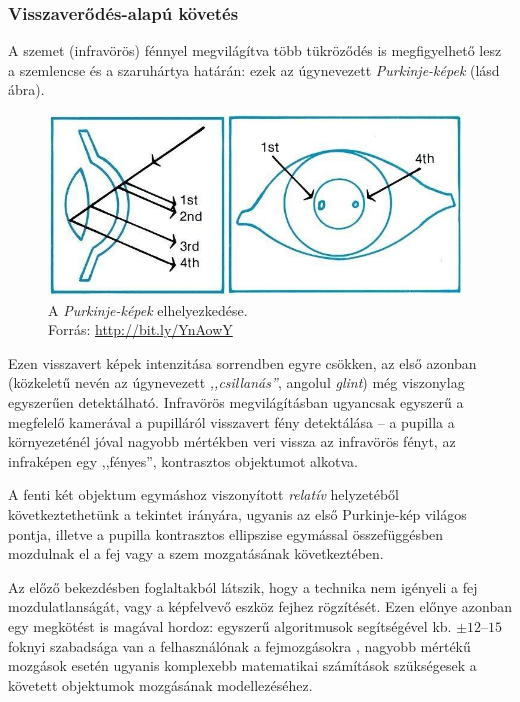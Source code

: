 \subsubsection{Visszaverődés-alapú követés}\label{sect:visszaverodes}

A szemet (infravörös) fénnyel megvilágítva több tükröződés is megfigyelhető lesz a szemlencse és a szaruhártya határán: ezek az úgynevezett \emph{Purkinje-képek} (lásd  ábra).

\begin{figure}[!ht]
\centering
\includegraphics[width=110mm, keepaspectratio]{figures/purkinje_kepek.png}
\caption{A \emph{Purkinje-képek} elhelyezkedése.\\Forrás: \url{http://bit.ly/YnAowY}}
\label{fig:purkinje}
\end{figure}

Ezen visszavert képek intenzitása sorrendben egyre csökken, az első azonban (közkeletű nevén az úgynevezett \emph{,,csillanás''}, angolul \emph{glint}) még viszonylag egyszerűen detektálható. Infravörös megvilágításban ugyancsak egyszerű a megfelelő kamerával a pupilláról visszavert fény detektálása -- a pupilla a környezeténél jóval nagyobb mértékben veri vissza az infravörös fényt, az infraképen egy ,,fényes'', kontrasztos objektumot alkotva.

A fenti két objektum egymáshoz viszonyított \emph{relatív} helyzetéből következtethetünk a tekintet irányára, ugyanis az első Purkinje-kép világos pontja, illetve a pupilla kontrasztos ellipszise egymással összefüggésben mozdulnak el a fej vagy a szem mozgatásának következtében.

Az előző bekezdésben foglaltakból látszik, hogy a technika nem igényeli a fej mozdulatlanságát, vagy a képfelvevő eszköz fejhez rögzítését. Ezen előnye azonban egy megkötést is magával hordoz: egyszerű algoritmusok segítségével kb. $\pm12$--$15$ foknyi szabadsága van a felhasználónak a fejmozgásokra \cite{scott}, nagyobb mértékű mozgások esetén ugyanis komplexebb matematikai számítások szükségesek a követett objektumok mozgásának modellezéséhez.

